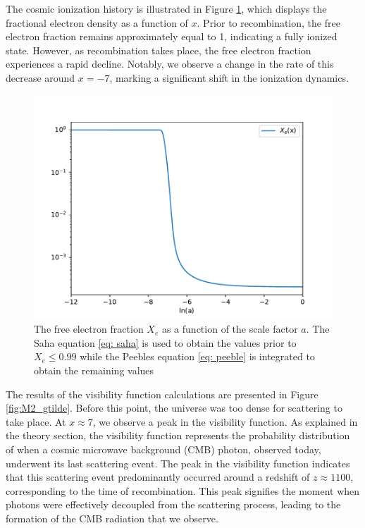 \documentclass{aa}
\begin{document}
The cosmic ionization history is illustrated in Figure \ref{fig:M2_Xe}, which displays the fractional electron density as a function of $x$. Prior to recombination, the free electron fraction remains approximately equal to 1, indicating a fully ionized state. However, as recombination takes place, the free electron fraction experiences a rapid decline. Notably, we observe a change in the rate of this decrease around $x = -7$, marking a significant shift in the ionization dynamics.
\begin{figure}[h!]
   \includegraphics[scale=0.5]{Figures/milestone_2/Xe.pdf}
   \caption{The free electron fraction $X_e$ as a function of the scale factor $a$.
    The Saha equation \eqref{eq: saha} is used to obtain the values prior to
    $X_e \leq 0.99$ while the Peebles equation \eqref{eq: peeble} is
    integrated to obtain the remaining values}
    \label{fig:M2_Xe}
\end{figure}
The results of the visibility function calculations are presented in Figure \ref{fig:M2_gtilde}. Before this point, the universe was too dense for scattering to take place. At $x \approx 7$, we observe a peak in the visibility function. As explained in the theory section, the visibility function represents the probability distribution of when a cosmic microwave background (CMB) photon, observed today, underwent its last scattering event. The peak in the visibility function indicates that this scattering event predominantly occurred around a redshift of $z \approx 1100$, corresponding to the time of recombination. This peak signifies the moment when photons were effectively decoupled from the scattering process, leading to the formation of the CMB radiation that we observe.
\end{document}
